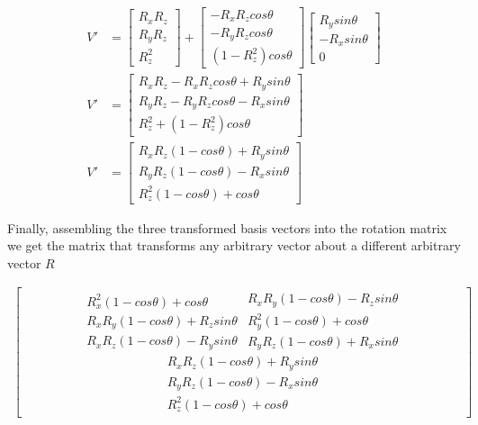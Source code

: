 \documentclass{article}
\begin{document}
    \begin{align}
        V' &= 
        \begin{bmatrix} R_xR_z \\ R_yR_z \\ R_z^2 \end{bmatrix} +  
        \begin{bmatrix} -R_xR_zcos\theta \\  -R_yR_zcos\theta \\ (1-R_z^2)cos\theta \end{bmatrix}
        \begin{bmatrix} R_ysin\theta \\ -R_xsin\theta \\ 0 \end{bmatrix} \\
        V' &= 
        \begin{bmatrix}
            R_xR_z - R_xR_zcos\theta + R_ysin\theta \\ 
            R_yR_z - R_yR_zcos\theta - R_xsin\theta \\ 
            R_z^2  + (1-R_z^2)cos\theta   
        \end{bmatrix} \\
        V' &= 
        \begin{bmatrix}
            R_xR_z(1 - cos\theta) + R_ysin\theta \\ 
            R_yR_z(1 - cos\theta) - R_xsin\theta \\ 
            R_z^2(1 - cos\theta) + cos\theta  
        \end{bmatrix} \label{eq:zaxisAfterRotation}
    \end{align}


    \noindent Finally, assembling the three transformed basis vectors into the rotation matrix we get the matrix that transforms any arbitrary vector about a different arbitrary vector $R$
    
    \begin{align}
        \begin{bmatrix}
            \begin{matrix}
                R_x^2(1 - cos\theta) + cos\theta \\ 
                R_xR_y(1 - cos\theta) + R_zsin\theta \\ 
                R_xR_z(1 - cos\theta) - R_ysin\theta  
            \end{matrix}
            \begin{matrix}
                R_xR_y(1 - cos\theta) - R_zsin\theta \\ 
                R_y^2(1 - cos\theta) + cos\theta \\ 
                R_yR_z(1 - cos\theta) + R_xsin\theta  
            \end{matrix}
            \begin{matrix}
                R_xR_z(1 - cos\theta) + R_ysin\theta \\ 
                R_yR_z(1 - cos\theta) - R_xsin\theta \\ 
                R_z^2(1 - cos\theta) + cos\theta  
            \end{matrix}
        \end{bmatrix}
    \end{align}
\end{document}
